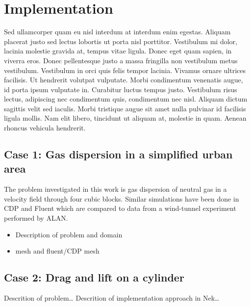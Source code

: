 
\chapter{Implementation} %

\label{introduction} %



Sed ullamcorper quam eu nisl interdum at interdum enim egestas. Aliquam placerat justo sed lectus lobortis ut porta nisl porttitor. Vestibulum mi dolor, lacinia molestie gravida at, tempus vitae ligula. Donec eget quam sapien, in viverra eros. Donec pellentesque justo a massa fringilla non vestibulum metus vestibulum. Vestibulum in orci quis felis tempor lacinia. Vivamus ornare ultrices facilisis. Ut hendrerit volutpat vulputate. Morbi condimentum venenatis augue, id porta ipsum vulputate in. Curabitur luctus tempus justo. Vestibulum risus lectus, adipiscing nec condimentum quis, condimentum nec nisl. Aliquam dictum sagittis velit sed iaculis. Morbi tristique augue sit amet nulla pulvinar id facilisis ligula mollis. Nam elit libero, tincidunt ut aliquam at, molestie in quam. Aenean rhoncus vehicula hendrerit.

\section{Case 1: Gas dispersion in a simplified urban area}
The problem investigated in this work is gas dispersion of neutral gas in a velocity field through four cubic blocks.
Similar simulations have been done in CDP and Fluent which are compared to data from a wind-tunnel experiment performed by ALAN.
\begin{itemize}
	\item Description of problem and domain
	\item mesh and fluent/CDP mesh
\end{itemize}

\section{Case 2: Drag and lift on a cylinder}
Descrition of problem\ldots
Descrition of implementation approach in Nek\ldots

